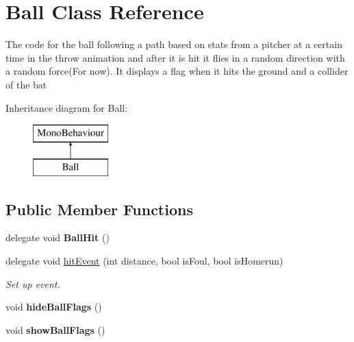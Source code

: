 \hypertarget{class_ball}{}\section{Ball Class Reference}
\label{class_ball}


The code for the ball following a path based on stats from a pitcher at a certain time in the throw animation and after it is hit it flies in a random direction with a random force(\+For now). It displays a flag when it hits the ground and a collider of the bat  


Inheritance diagram for Ball\+:\begin{figure}[H]
\begin{center}
\leavevmode
\includegraphics[height=2.000000cm]{class_ball}
\end{center}
\end{figure}
\subsection*{Public Member Functions}
\begin{DoxyCompactItemize}
\item 
delegate void {\bfseries Ball\+Hit} ()\hypertarget{class_ball_aa7c5a9ef594c67b2e315ca6f9aa72946}{}\label{class_ball_aa7c5a9ef594c67b2e315ca6f9aa72946}

\item 
delegate void \hyperlink{class_ball_a2d0d84bc63e64e13c31052231415af96}{hit\+Event} (int distance, bool is\+Foul, bool is\+Homerun)\hypertarget{class_ball_a2d0d84bc63e64e13c31052231415af96}{}\label{class_ball_a2d0d84bc63e64e13c31052231415af96}

\begin{DoxyCompactList}\small\item\em Set up event. \end{DoxyCompactList}\item 
void {\bfseries hide\+Ball\+Flags} ()\hypertarget{class_ball_a231e17090b160eb3474a0c17d64ba7f3}{}\label{class_ball_a231e17090b160eb3474a0c17d64ba7f3}

\item 
void {\bfseries show\+Ball\+Flags} ()\hypertarget{class_ball_a015534449de746bd8708b57c3ba71fe1}{}\label{class_ball_a015534449de746bd8708b57c3ba71fe1}

\end{DoxyCompactItemize}
